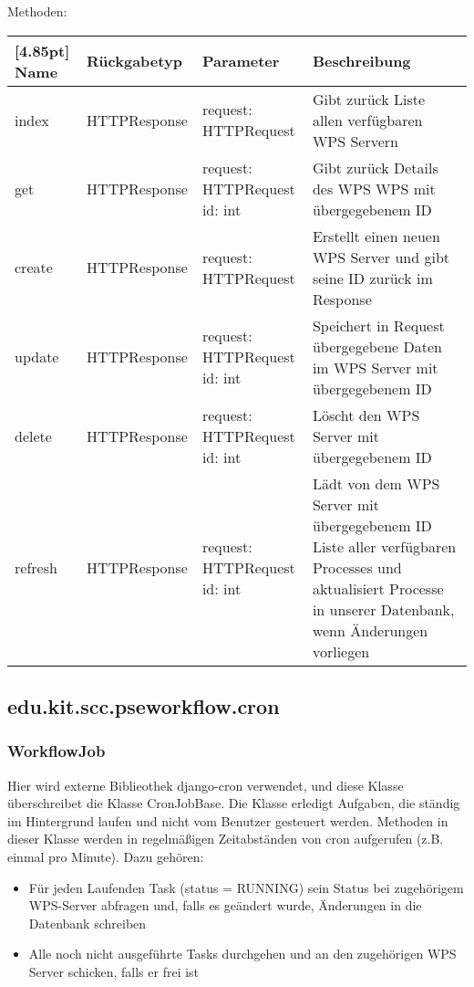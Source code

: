 		Methoden:
		\begin{center}
		    \setlength\tabcolsep{5pt}
        	\renewcommand{\arraystretch}{1.5}
            	\begin{tabularx}{\textwidth}{|l|l|l|X|}
            	\hline
            	\rowcolor[gray]{0.75}[4.85pt]
        		Name & Rückgabetyp & Parameter & Beschreibung \\ \hline 
                index & HTTPResponse & request: HTTPRequest & Gibt zurück Liste allen verfügbaren WPS Servern \\ \hline
                get & HTTPResponse & \thead{request: HTTPRequest\\id: int} & Gibt zurück Details des WPS WPS mit übergegebenem ID \\ \hline
                create & HTTPResponse & request: HTTPRequest & Erstellt einen neuen WPS Server und gibt seine ID zurück im Response \\ \hline
                update& HTTPResponse & \thead{request: HTTPRequest\\id: int} & Speichert in Request übergegebene Daten im WPS Server mit übergegebenem ID \\ \hline
                delete & HTTPResponse & \thead{request: HTTPRequest\\id: int} & Löscht den WPS Server mit übergegebenem ID \\ \hline
                refresh & HTTPResponse & \thead{request: HTTPRequest\\id: int} & Lädt von dem WPS Server mit übergegebenem ID Liste aller verfügbaren Processes und aktualisiert Processe in unserer Datenbank, wenn Änderungen vorliegen \\ \hline
            	\end{tabularx}
		\end{center}

    \subsection{edu.kit.scc.pseworkflow.cron}

		\subsubsection{WorkflowJob}
        
    Hier wird externe Biblieothek django-cron verwendet, und diese Klasse überschreibet die Klasse CronJobBase.\newline
        Die Klasse erledigt Aufgaben, die ständig im Hintergrund laufen und nicht vom Benutzer gesteuert werden. Methoden in dieser Klasse werden in regelmäßigen Zeitabständen von cron aufgerufen (z.B. einmal pro Minute). Dazu gehören:
        \begin{itemize}
            \item Für jeden Laufenden Task (status = RUNNING) sein Status bei zugehörigem WPS-Server abfragen und, falls es geändert wurde, Änderungen in die Datenbank schreiben
            \item Alle noch nicht ausgeführte Tasks durchgehen und an den zugehörigen WPS Server schicken, falls er frei ist
        \end{itemize}
		
